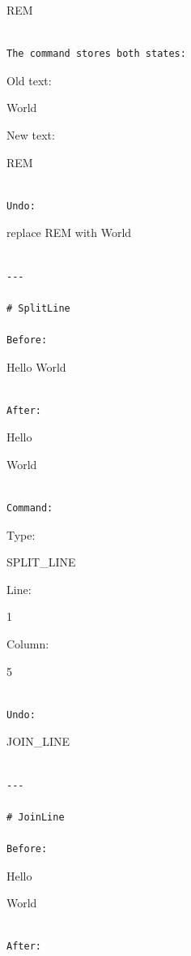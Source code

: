 \documentclass[
  oneside,
  openany]{book}
\begin{document}
REM

\begin{verbatim}

The command stores both states:
\end{verbatim}

Old text:

World

New text:

REM

\begin{verbatim}

Undo:
\end{verbatim}

replace REM with World

\begin{verbatim}

---

# SplitLine

Before:
\end{verbatim}

Hello World

\begin{verbatim}

After:
\end{verbatim}

Hello

World

\begin{verbatim}

Command:
\end{verbatim}

Type:

SPLIT\_LINE

Line:

1

Column:

5

\begin{verbatim}

Undo:
\end{verbatim}

JOIN\_LINE

\begin{verbatim}

---

# JoinLine

Before:
\end{verbatim}

Hello

World

\begin{verbatim}

After:
\end{verbatim}
\end{document}
